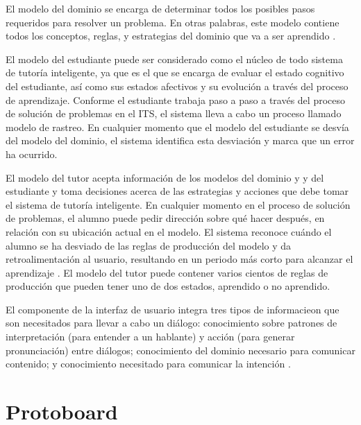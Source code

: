 El modelo del dominio se encarga de determinar todos los posibles
pasos requeridos para resolver un problema. En otras palabras, este
modelo contiene todos los conceptos, reglas, y estrategias del
dominio que va a ser aprendido \cite{nkambou2010advances}.

El modelo del estudiante puede ser considerado como el núcleo de todo
sistema de tutoría inteligente, ya que es el que se encarga de evaluar
el estado cognitivo del estudiante, así como sus estados afectivos y
su evolución a través del proceso de aprendizaje. Conforme el
estudiante trabaja paso a paso a través del proceso de solución de
problemas en el ITS, el sistema lleva a cabo un proceso llamado
modelo de rastreo. En cualquier momento que el modelo del estudiante
se desvía del modelo del dominio, el sistema identifica esta
desviación y marca que un error ha ocurrido.

El modelo del tutor acepta información de los modelos del dominio y
y del estudiante y toma decisiones acerca de las estrategias y
acciones que debe tomar el sistema de tutoría inteligente. En
cualquier momento en el proceso de solución de problemas, el alumno
puede pedir dirección sobre qué hacer después, en relación con su
ubicación actual en el modelo. El sistema reconoce cuándo el alumno se
ha desviado de las reglas de producción del modelo y da
retroalimentación al usuario, resultando en un periodo más corto para
alcanzar el aprendizaje \cite{koedinger1997intelligent}. El modelo del
tutor puede contener varios cientos de reglas de producción que pueden
tener uno de dos estados, aprendido o no aprendido.

El componente de la interfaz de usuario integra tres tipos de
informacieon que son necesitados para llevar a cabo un diálogo:
conocimiento sobre patrones de interpretación (para entender a un
hablante) y acción (para generar pronunciación) entre diálogos;
conocimiento del dominio necesario para comunicar contenido; y
conocimiento necesitado para comunicar la intención \cite{padayachee1999intelligent}.

\section{Protoboard}
\label{protoboard}
